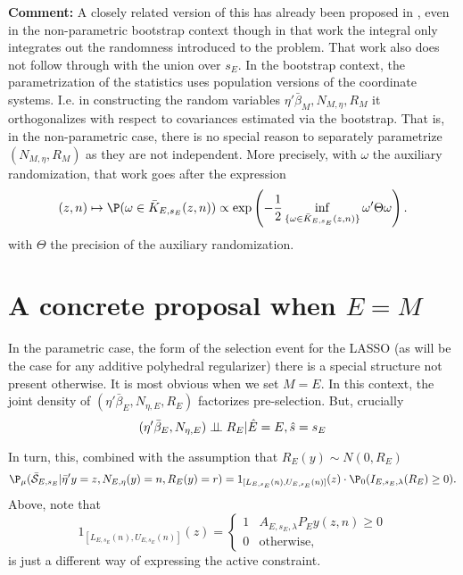 \documentclass{article}
\newcommand{\OLS}{\bar{\beta}}
\newcommand{\indep}{\perp\kern-5pt\perp}
\begin{document}
        {\bf Comment:} A closely related version of this has already been
        proposed in \cite{snigdha:jelena}, even in the non-parametric
        bootstrap context though in that work the integral only
        integrates out the randomness introduced to the problem.  That
        work also does not follow through with the union over $s_E$.
        In the bootstrap context, the parametrization of the
        statistics uses population versions of the coordinate
        systems. I.e. in constructing the random variables
        $\eta'\OLS_M, N_{M,\eta}, R_M$ it orthogonalizes with respect
        to covariances estimated via the bootstrap.  That is, in the
        non-parametric case, there is no special reason to separately
        parametrize $(N_{M,\eta}, R_M)$ as they are not independent.
        More precisely, with $\omega$ the auxiliary randomization,
        that work goes after the expression
        \begin{equation}
          \label{eq:LD:rand}
        (z,n) \mapsto \P(\omega \in \bar{K}_{E,s_E}(z,n)) \propto
          \exp\left(-\frac{1}{2} \inf_{\{\omega \in
            \bar{K}_{E,s_E}(z,n)\}} \omega' \Theta \omega\right).
        \end{equation}
        with $\Theta$ the precision of the auxiliary randomization.

        \section{A concrete proposal when $E=M$}



        In the parametric case, the form of the selection event for
        the LASSO (as will be the case for any additive polyhedral
        regularizer) there is a special structure not present
        otherwise. It is most obvious when we set $M=E$. In this
        context, the joint density of $(\eta'\OLS_E, N_{\eta,E}, R_E)$
        factorizes pre-selection. But, crucially
        \begin{equation}
          \label{eq:cond:independence}
          (\eta'\OLS_E, N_{\eta,E}) \indep R_E | \hat{E}=E,
          \hat{s}=s_E
        \end{equation}
        
        In turn, this, combined with the assumption that $R_E(y) \sim
        N(0, R_E)$
        \begin{equation}
          \P_{\mu}(\bar{\cal S}_{E,s_E} | \bar{\eta}'y=z,
          N_{E,\eta}(y)=n, R_E(y)=r) = 1_{[L_{E,s_E}(n),
              U_{E,s_E}(n)]}(z) \cdot \P_{0}(I_{E,s_E,\lambda}(R_E) \geq 0).
        \end{equation}
        Above, note that
        $$ 1_{[L_{E,s_E}(n), U_{E,s_E}(n)]}(z) = \begin{cases} 1 &
          A_{E,s_E,\lambda}P_Ey(z,n) \geq 0 \\ 0 & \text{otherwise,}
          \end{cases}
        $$ is just a different way of expressing the active
        constraint.
          
\end{document}
